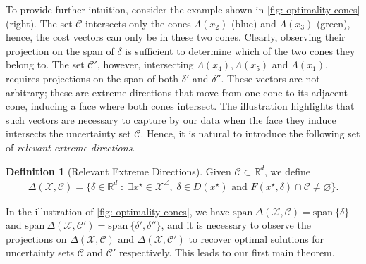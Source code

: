 \documentclass[11pt]{article}
\theoremstyle{plain}
\theoremstyle{definition}
\newtheorem{definition}{Definition}
\newcommand{\R}[0]{\mathbb R}
\newcommand{\Vect}{\mathrm{span}~}
\newcommand{\cX}{\mathcal{X}}
\newcommand{\cC}{\mathcal{C}}
\begin{document}

To provide further intuition, consider the example shown in \cref{fig: optimality cones} (right). The set $\cC$ intersects only the cones $\Lambda(x_2)$ (blue) and $\Lambda(x_3)$ (green), hence, the cost vectors can only be in these two cones. Clearly, observing their projection on the span of $\delta$ is sufficient to determine which of the two cones they belong to. The set $\cC'$, however, intersecting $\Lambda(x_4),\Lambda(x_5)$ and $\Lambda(x_1)$, requires projections on the span of both $\delta'$ and $\delta''$. These vectors are not arbitrary; these are extreme directions that move from one cone to its adjacent cone, inducing a face where both cones intersect. The illustration highlights that such vectors are necessary to capture by our data when the face they induce intersects the uncertainty set $\cC$. 
Hence, it is natural to introduce the following set of \textit{relevant extreme directions}.
\begin{definition}[Relevant Extreme Directions]
    Given $\cC\subset \R^d$, we define 
   \begin{align*}
        \Delta(\cX,\cC)=\{\delta \in \R^d \; : \; \exists x^\star\in \cX^\angle,\; \delta \in D(x^\star) \text{ and }F(x^\star,\delta)\cap \cC\neq \varnothing\}.
    \end{align*}
\end{definition}
In the illustration of \cref{fig: optimality cones}, we have $\Vect \Delta(\cX,\cC)=\Vect \{\delta\}$ and $\Vect \Delta(\cX,\cC')=\Vect \{\delta',\delta''\}$, and it is necessary to observe the projections on $\Delta(\cX,\cC)$ and $\Delta(\cX,\cC')$ to recover optimal solutions for uncertainty sets $\cC$ and $\cC'$ respectively. This leads to our first main theorem.
\end{document}
